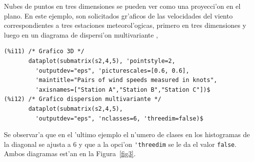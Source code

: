 \documentclass[spanish,12pt,a4paper]{article}
\begin{document}
\begin{description}
Nubes de puntos en tres dimensiones se pueden ver como una proyecci'on en el plano. En  este ejemplo, son solicitados gr'aficos de las velocidades del viento correspondientes a tres estaciones meteorol'ogicas, primero en tres dimensiones y luego en un diagrama de dispersi'on multivariante \cite{john}, 
\begin{verbatim}
(%i11) /* Grafico 3D */
       dataplot(submatrix(s2,4,5), 'pointstyle=2,
         'outputdev="eps", 'picturescales=[0.6, 0.6],
         'maintitle="Pairs of wind speeds measured in knots",
         'axisnames=["Station A","Station B","Station C"])$
(%i12) /* Grafico dispersion multivariante */
       dataplot(submatrix(s2,4,5),
         'outputdev="eps", 'nclasses=6, 'threedim=false)$
\end{verbatim}
Se observar'a que en el 'ultimo ejemplo el n'umero de clases en los histogramas de la diagonal se ajusta a 6 y que a la opci'on \verb|'threedim| se le da el valor \verb|false|. Ambos diagramas est'an en la Figura~\ref{fig3}.



\end{description}
\end{document}
